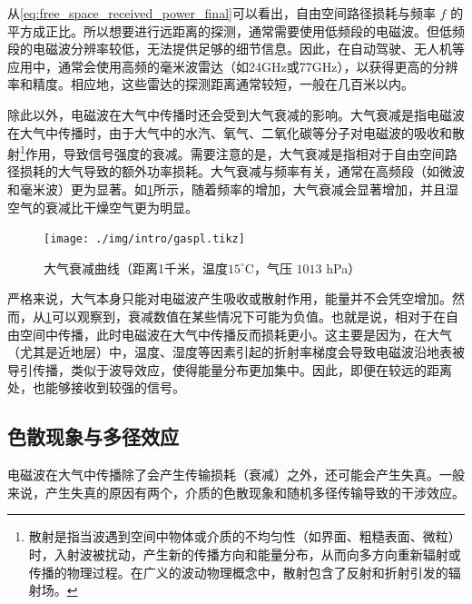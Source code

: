 从\cref{eq:free_space_received_power_final}可以看出，自由空间路径损耗与频率 $f$ 的平方成正比。所以想要进行远距离的探测，通常需要使用低频段的电磁波。但低频段的电磁波分辨率较低，无法提供足够的细节信息。因此，在自动驾驶、无人机等应用中，通常会使用高频的毫米波雷达（如24GHz或77GHz），以获得更高的分辨率和精度。相应地，这些雷达的探测距离通常较短，一般在几百米以内。

除此以外，电磁波在大气中传播时还会受到大气衰减的影响。大气衰减是指电磁波在大气中传播时，由于大气中的水汽、氧气、二氧化碳等分子对电磁波的吸收和散射\footnote{散射是指当波遇到空间中物体或介质的不均匀性（如界面、粗糙表面、微粒）时，入射波被扰动，产生新的传播方向和能量分布，从而向多方向重新辐射或传播的物理过程。在广义的波动物理概念中，散射包含了反射和折射引发的辐射场。}作用，导致信号强度的衰减。需要注意的是，大气衰减是指相对于自由空间路径损耗的大气导致的额外功率损耗。大气衰减与频率有关，通常在高频段（如微波和毫米波）更为显著。如\cref{fig_chp1_gaspl}所示，随着频率的增加，大气衰减会显著增加，并且湿空气的衰减比干燥空气更为明显。

\begin{figure}[htb!]
    \centering
    \texttt{[image: ./img/intro/gaspl.tikz]}
    \caption{大气衰减曲线\supercite{itu_r_p676_11}（距离1千米，温度$15^\circ$C，气压 $1013$ hPa）}
    \label{fig_chp1_gaspl}
\end{figure}

严格来说，大气本身只能对电磁波产生吸收或散射作用，能量并不会凭空增加。然而，从\cref{fig_chp1_gaspl}可以观察到，衰减数值在某些情况下可能为负值。也就是说，相对于在自由空间中传播，此时电磁波在大气中传播反而损耗更小。这主要是因为，在大气（尤其是近地层）中，温度、湿度等因素引起的折射率梯度会导致电磁波沿地表被导引传播，类似于波导效应，使得能量分布更加集中。因此，即便在较远的距离处，也能够接收到较强的信号。

\subsection{色散现象与多径效应}
电磁波在大气中传播除了会产生传输损耗（衰减）之外，还可能会产生失真。一般来说，产生失真的原因有两个，介质的色散现象和随机多径传输导致的干涉效应。

